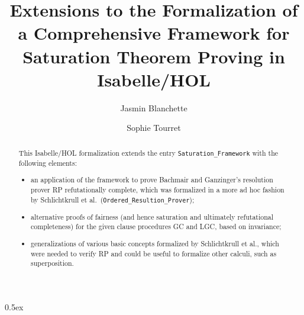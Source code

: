 \documentclass[11pt,a4paper]{article}
\begin{document}
\title{Extensions to the Formalization of a Comprehensive Framework for Saturation Theorem Proving in Isabelle/HOL}
\author{Jasmin Blanchette \and Sophie Tourret}
\maketitle

\begin{abstract}
\noindent
This Isabelle/HOL formalization extends the entry \verb|Saturation_Framework|
with the following elements:

\begin{itemize}
\item an application of the framework to prove Bachmair and Ganzinger's
  resolution prover \textsf{RP} refutationally complete, which was formalized
  in a more ad hoc fashion by Schlichtkrull et al.\
  (\verb|Ordered_Resultion_Prover|);

\item alternative proofs of fairness (and hence saturation and ultimately
  refutational completeness) for the given clause procedures \textsf{GC} and
  \textsf{LGC}, based on invariance;

\item generalizations of various basic concepts formalized by Schlichtkrull et
  al., which were needed to verify \textsf{RP} and could be useful to formalize
  other calculi, such as superposition.
\end{itemize}
\end{abstract}

\tableofcontents

\parindent 0pt\parskip 0.5ex



%
%
\end{document}
